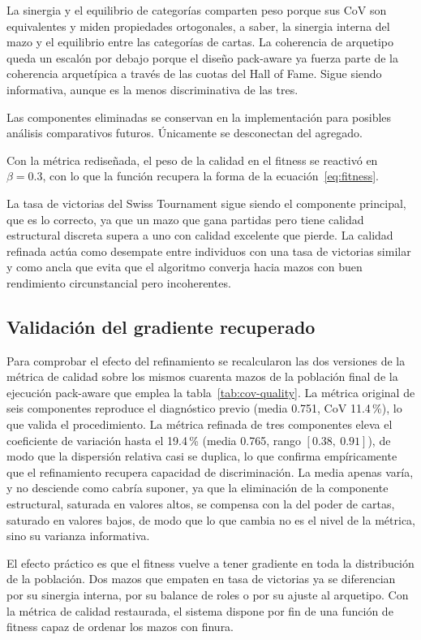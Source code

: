 La sinergia y el equilibrio de categorías comparten peso porque sus CoV son equivalentes y miden propiedades ortogonales, a saber, la sinergia interna del mazo y el equilibrio entre las categorías de cartas. La coherencia de arquetipo queda un escalón por debajo porque el diseño pack-aware ya fuerza parte de la coherencia arquetípica a través de las cuotas del Hall of Fame. Sigue siendo informativa, aunque es la menos discriminativa de las tres.

Las componentes eliminadas se conservan en la implementación para posibles análisis comparativos futuros. Únicamente se desconectan del agregado.

Con la métrica rediseñada, el peso de la calidad en el fitness se reactivó en $\beta = 0.3$, con lo que la función recupera la forma de la ecuación~\ref{eq:fitness}.

La tasa de victorias del Swiss Tournament sigue siendo el componente principal, que es lo correcto, ya que un mazo que gana partidas pero tiene calidad estructural discreta supera a uno con calidad excelente que pierde. La calidad refinada actúa como desempate entre individuos con una tasa de victorias similar y como ancla que evita que el algoritmo converja hacia mazos con buen rendimiento circunstancial pero incoherentes.

\subsection{Validación del gradiente recuperado}

Para comprobar el efecto del refinamiento se recalcularon las dos versiones de la métrica de calidad sobre los mismos cuarenta mazos de la población final de la ejecución pack-aware que emplea la tabla~\ref{tab:cov-quality}. La métrica original de seis componentes reproduce el diagnóstico previo (media 0.751, CoV 11.4\,\%), lo que valida el procedimiento. La métrica refinada de tres componentes eleva el coeficiente de variación hasta el 19.4\,\% (media 0.765, rango $[0.38,\ 0.91]$), de modo que la dispersión relativa casi se duplica, lo que confirma empíricamente que el refinamiento recupera capacidad de discriminación. La media apenas varía, y no desciende como cabría suponer, ya que la eliminación de la componente estructural, saturada en valores altos, se compensa con la del poder de cartas, saturado en valores bajos, de modo que lo que cambia no es el nivel de la métrica, sino su varianza informativa.

El efecto práctico es que el fitness vuelve a tener gradiente en toda la distribución de la población. Dos mazos que empaten en tasa de victorias ya se diferencian por su sinergia interna, por su balance de roles o por su ajuste al arquetipo. Con la métrica de calidad restaurada, el sistema dispone por fin de una función de fitness capaz de ordenar los mazos con finura.

